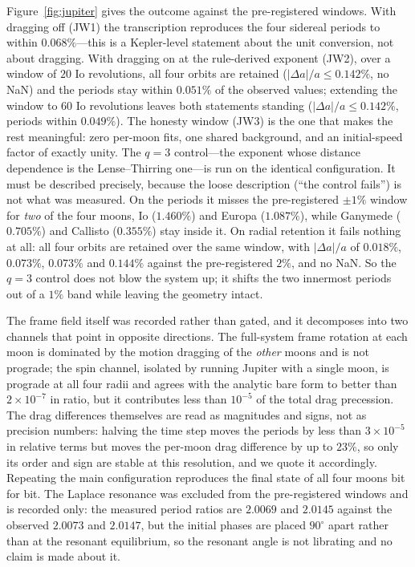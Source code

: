 \documentclass[aps,reprint,amsmath,amssymb,nofootinbib,superscriptaddress,floatfix]{revtex4-2}
\begin{document}
Figure~\ref{fig:jupiter} gives the outcome against the pre-registered
windows.
With dragging off (JW1) the transcription reproduces the four sidereal
periods to within $0.068\%$---this is a Kepler-level statement about
the unit conversion, not about dragging.
With dragging on at the rule-derived exponent (JW2), over a window of
$20$ Io revolutions, all four orbits are retained
($|\Delta a|/a\leq0.142\%$, no NaN) and the periods stay within
$0.051\%$ of the observed values; extending the window to $60$ Io
revolutions leaves both statements standing
($|\Delta a|/a\leq0.142\%$, periods within $0.049\%$).
The honesty window (JW3) is the one that makes the rest meaningful:
zero per-moon fits, one shared background, and an initial-speed factor
of exactly unity.
The $q=3$ control---the exponent whose distance dependence is the
Lense--Thirring one---is run on the identical configuration.
It must be described precisely, because the loose description
(``the control fails'') is not what was measured.
On the periods it misses the pre-registered $\pm1\%$ window for
\emph{two} of the four moons, Io ($1.460\%$) and Europa ($1.087\%$),
while Ganymede ($0.705\%$) and Callisto ($0.355\%$) stay inside it.
On radial retention it fails nothing at all: all four orbits are
retained over the same window, with $|\Delta a|/a$ of $0.018\%$,
$0.073\%$, $0.073\%$ and $0.144\%$ against the pre-registered $2\%$,
and no NaN.
So the $q=3$ control does not blow the system up; it shifts the two
innermost periods out of a $1\%$ band while leaving the geometry intact.

The frame field itself was recorded rather than gated, and it
decomposes into two channels that point in opposite directions.
The full-system frame rotation at each moon is dominated by the
motion dragging of the \emph{other} moons and is not prograde; the
spin channel, isolated by running Jupiter with a single moon, is
prograde at all four radii and agrees with the analytic bare form to
better than $2\times10^{-7}$ in ratio, but it contributes less than
$10^{-5}$ of the total drag precession.
The drag differences themselves are read as magnitudes and signs, not
as precision numbers: halving the time step moves the periods by less
than $3\times10^{-5}$ in relative terms but moves the per-moon drag
difference by up to $23\%$, so only its order and sign are stable at
this resolution, and we quote it accordingly.
Repeating the main configuration reproduces the final state of all
four moons bit for bit.
The Laplace resonance was excluded from the pre-registered windows and
is recorded only: the measured period ratios are $2.0069$ and $2.0145$
against the observed $2.0073$ and $2.0147$, but the initial phases are
placed $90^{\circ}$ apart rather than at the resonant equilibrium, so
the resonant angle is not librating and no claim is made about it.
\end{document}
